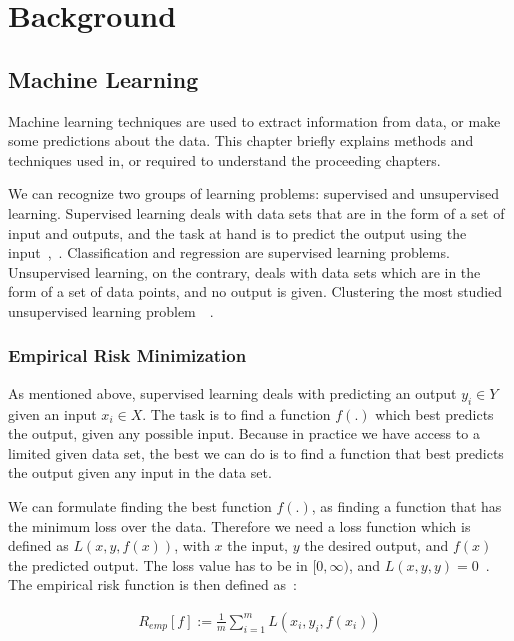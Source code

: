 \chapter{Background}
\label{sec:background}

\section{Machine Learning}
Machine learning techniques are used to extract information from data, or make some predictions about the data. This chapter briefly explains methods and techniques used in, or required to understand the proceeding chapters.

We can recognize two groups of learning problems: supervised and unsupervised learning. Supervised learning deals with data sets that are in the form of a set of input and outputs, and the task at hand is to predict the output using the input~\cite[Ch. 2]{statistical-learning},~\cite[Ch. 1]{murphy2012machine}. Classification and regression are supervised learning problems. Unsupervised learning, on the contrary, deals with data sets which are in the form of a set of data points, and no output is given. Clustering the most studied unsupervised learning problem~\cite[Ch. 14]{statistical-learning}~\cite[Ch. 1]{murphy2012machine}.

\subsection{Empirical Risk Minimization}
\label{chap:empirical-risk-minimization}
As mentioned above, supervised learning deals with predicting an output $y_i \in Y$ given an input $x_i \in X$. The task is to find a function $f(.)$ which best predicts the output, given any possible input. Because in practice we have access to a limited given data set, the best we can do is to find a function that best predicts the output given any input in the data set.

We can formulate finding the best function $f(.)$, as finding a function that has the minimum loss over the data. Therefore we need a loss function which is defined as $L(x, y, f(x))$, with $x$ the input, $y$ the desired output, and $f(x)$ the predicted output. The loss value has to be in $[0, \infty)$, and $L(x, y, y) = 0$~\cite[p. 62]{learning-with-kernels}. The empirical risk function is then defined as~\cite[p. 67]{learning-with-kernels}:

  \begin{align}
    R_{emp}[f] := \frac{1}{m}\sum_{i = 1}^{m} L(x_i, y_i, f(x_i))
  \end{align}
  
